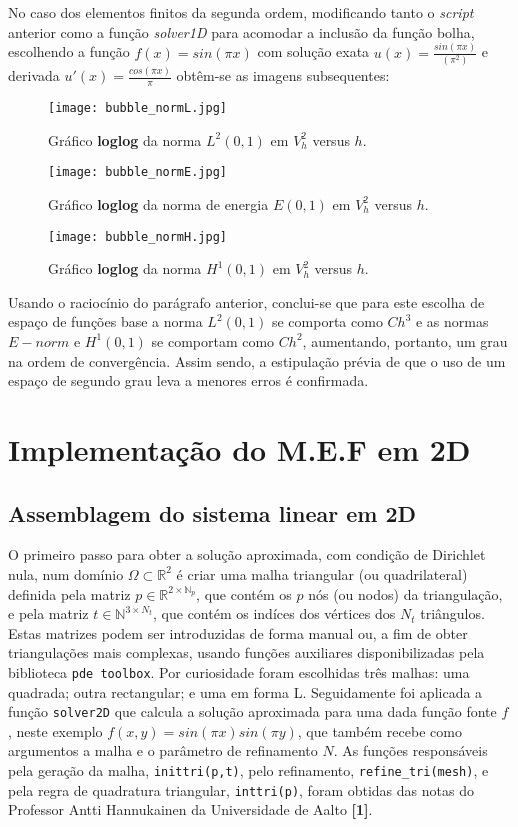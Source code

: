 \documentclass{article}
\newcommand{\R}{\mathbb{R}}
\newcommand{\N}{\mathbb{N}}
\theoremstyle{definition}
\theoremstyle{plain}
\numberwithin{equation}{section}
\newcommand{\tab}{\hspace{10mm}}
\begin{document}
\tab No caso dos elementos finitos da segunda ordem, modificando tanto o \emph{script} anterior como a função \emph{solver1D} para acomodar a inclusão da função bolha, escolhendo a função $f(x)=sin(\pi x)$ com solução exata $u(x)=\frac{sin(\pi x)}{(\pi^2)}$ e derivada $u'(x)=\frac{cos(\pi x)}{\pi}$ obtêm-se as imagens subsequentes:

\begin{figure}[H]
\centering
\texttt{[image: bubble\_normL.jpg]}
\caption{Gráfico \textbf{loglog} da norma $L^2(0,1)$ em $V_h^2$ versus $h$. }
\end{figure}

\begin{figure}[H]
\centering
\texttt{[image: bubble\_normE.jpg]}
\caption{Gráfico \textbf{loglog} da norma de energia $E(0,1)$ em $V_h^2$ versus $h$. }
\end{figure}

\begin{figure}[H]
\centering
\texttt{[image: bubble\_normH.jpg]}
\caption{Gráfico \textbf{loglog} da norma $H^1(0,1)$ em $V_h^2$ versus $h$.}
\end{figure}

\vspace{5mm}

\tab Usando o raciocínio do parágrafo anterior, conclui-se que para este escolha de espaço de funções base a norma $L^2(0,1)$ se comporta como $Ch^3$ e as normas $E-norm$ e $H^1(0,1)$ se comportam como $Ch^2$, aumentando, portanto, um grau na ordem de convergência. Assim sendo, a estipulação prévia de que o uso de um espaço de segundo grau leva a menores erros é confirmada.

\section{Implementação do M.E.F em 2D}
\subsection{Assemblagem do sistema linear em 2D}
\tab O primeiro passo para obter a solução aproximada, com condição de Dirichlet nula, num domínio $\Omega \subset \mathbb{R}^2$ é criar uma malha triangular (ou quadrilateral) definida pela matriz $p \in \R^{2 \times \N_p}$, que contém os $p$ nós (ou nodos) da triangulação, e pela matriz $t \in \N^{3 \times N_t}$, que contém os indíces dos vértices dos $N_t$ triângulos. Estas matrizes podem ser introduzidas de forma manual ou, a fim de obter triangulações mais complexas, usando funções auxiliares disponibilizadas pela biblioteca \verb +pde toolbox+. Por curiosidade foram escolhidas três malhas: uma quadrada; outra rectangular; e uma em forma L. Seguidamente foi aplicada a função \verb +solver2D+ que calcula a solução aproximada para uma dada função fonte $f$, neste exemplo $f(x,y)=sin(\pi x)sin(\pi y)$, que também recebe como argumentos a malha e o parâmetro de refinamento $N$. As funções responsáveis pela geração da malha, \verb +inittri(p,t)+, pelo refinamento, \verb +refine_tri(mesh)+, e pela regra de quadratura triangular, \verb +inttri(p)+, foram obtidas das notas do Professor Antti Hannukainen da Universidade de Aalto \textbf{[1]}.
\end{document}
